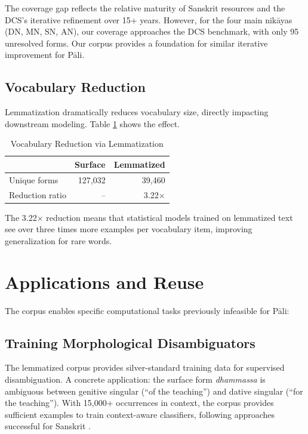 \documentclass[11pt,twocolumn]{article}
\begin{document}
The coverage gap reflects the relative maturity of Sanskrit resources and the DCS's iterative refinement over 15+ years. However, for the four main nikāyas (DN, MN, SN, AN), our coverage approaches the DCS benchmark, with only 95 unresolved forms. Our corpus provides a foundation for similar iterative improvement for Pāli.

\subsection{Vocabulary Reduction}

Lemmatization dramatically reduces vocabulary size, directly impacting downstream modeling. Table \ref{tab:reduction} shows the effect.

\begin{table}[ht]
\centering
\caption{Vocabulary Reduction via Lemmatization}
\label{tab:reduction}
\begin{tabular}{lrr}
\toprule
 & Surface & Lemmatized \\
\midrule
Unique forms & 127,032 & 39,460 \\
Reduction ratio & -- & 3.22$\times$ \\
\bottomrule
\end{tabular}
\end{table}

The 3.22$\times$ reduction means that statistical models trained on lemmatized text see over three times more examples per vocabulary item, improving generalization for rare words.

\section{Applications and Reuse}
\label{sec:reuse}

The corpus enables specific computational tasks previously infeasible for Pāli:

\subsection{Training Morphological Disambiguators}

The lemmatized corpus provides silver-standard training data for supervised disambiguation. A concrete application: the surface form \emph{dhammassa} is ambiguous between genitive singular (``of the teaching'') and dative singular (``for the teaching''). With 15,000+ occurrences in context, the corpus provides sufficient examples to train context-aware classifiers, following approaches successful for Sanskrit \citep{krishna2018}.
\end{document}
